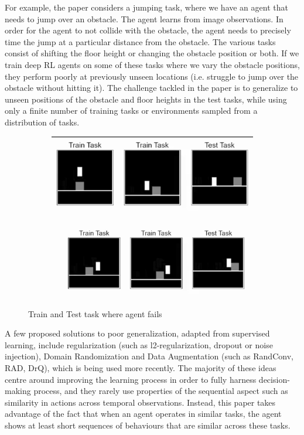 \documentclass{usiinftr}
\begin{document}
For example, the paper considers a jumping task, where we have an agent that needs to jump over an obstacle. The agent learns from image observations. In order for the agent to not collide with the obstacle, the agent needs to precisely time the jump at a particular distance from the obstacle. The various tasks consist of shifting the floor height or changing the obstacle position or both. If we train deep RL agents on some of these tasks where we vary the obstacle positions, they perform poorly at previously unseen locations (i.e. struggle to jump over the obstacle without hitting it). The challenge tackled in the paper is to generalize to unseen positions of the obstacle and floor heights in the test tasks, while using only a finite number of training tasks or environments sampled from a distribution of tasks.

\begin{figure}[h]
    \centering
    \begin{subfigure}
        \centering
        \includegraphics[width = 0.45\linewidth]{figures/image1.png}
        \label{}
    \end{subfigure}%
    \begin{subfigure}
        \centering
        \includegraphics[width = 0.5\linewidth]{figures/image2.png}
        \label{}
    \end{subfigure}
    \caption{Train and Test task where agent fails}
    \label{fig:TrainTestTask}
\end{figure}

A few proposed solutions to poor generalization, adapted from supervised learning, include regularization (such as l2-regularization, dropout or noise injection), Domain Randomization and Data Augmentation (such as RandConv, RAD, DrQ), which is being used more recently. The majority of these ideas centre around improving the learning process in order to fully harness decision-making process, and they rarely use properties of the sequential aspect such as similarity in actions across temporal observations. Instead, this paper takes advantage of the fact that when an agent operates in similar tasks, the agent shows at least short sequences of behaviours that are similar across these tasks.
\end{document}
